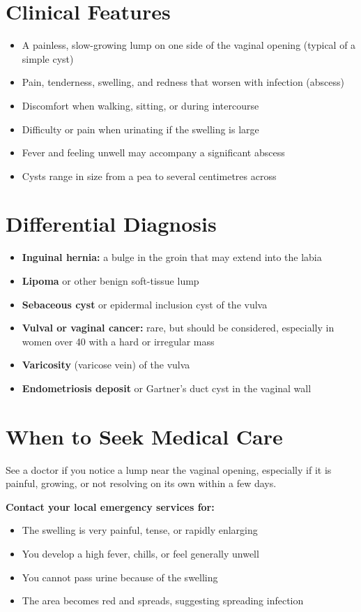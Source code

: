 \section*{Clinical Features}
\begin{itemize}
    \item A painless, slow-growing lump on one side of the vaginal opening (typical of a simple cyst)
    \item Pain, tenderness, swelling, and redness that worsen with infection (abscess)
    \item Discomfort when walking, sitting, or during intercourse
    \item Difficulty or pain when urinating if the swelling is large
    \item Fever and feeling unwell may accompany a significant abscess
    \item Cysts range in size from a pea to several centimetres across
\end{itemize}

\section*{Differential Diagnosis}
\begin{itemize}
    \item \textbf{Inguinal hernia:} a bulge in the groin that may extend into the labia
    \item \textbf{Lipoma} or other benign soft-tissue lump
    \item \textbf{Sebaceous cyst} or epidermal inclusion cyst of the vulva
    \item \textbf{Vulval or vaginal cancer:} rare, but should be considered, especially in women over 40 with a hard or irregular mass
    \item \textbf{Varicosity} (varicose vein) of the vulva
    \item \textbf{Endometriosis deposit} or Gartner's duct cyst in the vaginal wall
\end{itemize}

\section*{When to Seek Medical Care}
See a doctor if you notice a lump near the vaginal opening, especially if it is painful, growing, or not resolving on its own within a few days.

\textbf{Contact your local emergency services for:}
\begin{itemize}
    \item The swelling is very painful, tense, or rapidly enlarging
    \item You develop a high fever, chills, or feel generally unwell
    \item You cannot pass urine because of the swelling
    \item The area becomes red and spreads, suggesting spreading infection
\end{itemize}


